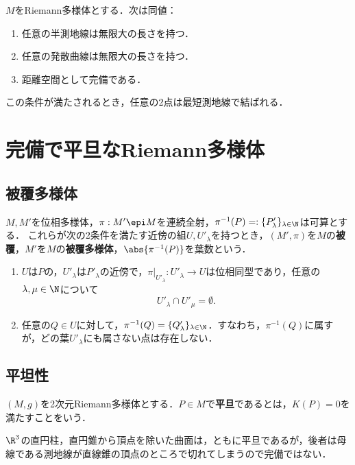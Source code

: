 \documentclass[uplatex,dvipdfmx]{jsreport}
\begin{document}
\begin{theorem}
    $M$をRiemann多様体とする．次は同値：
    \begin{enumerate}
        \item 任意の半測地線は無限大の長さを持つ．
        \item 任意の発散曲線は無限大の長さを持つ．
        \item 距離空間として完備である．
    \end{enumerate}
    この条件が満たされるとき，任意の2点は最短測地線で結ばれる．
\end{theorem}

\section{完備で平旦なRiemann多様体}

\subsection{被覆多様体}

\begin{definition}
    $M,M'$を位相多様体，$\pi:M'\epi M$を連続全射，$\pi^{-1}(P)=:\{P'_{\lambda}\}_{\lambda\in\N}$は可算とする．
    これらが次の2条件を満たす近傍の組$U,U'_\lambda$を持つとき，$(M',\pi)$を$M$の\textbf{被覆}，$M'$を$M$の\textbf{被覆多様体}，$\abs{\pi^{-1}(P)}$を葉数という．
    \begin{enumerate}
        \item $U$は$P$の，$U'_\lambda$は$P'_\lambda$の近傍で，$\pi|_{U'_\lambda}:U'_\lambda\to U$は位相同型であり，任意の$\lambda,\mu\in\N$について
        \[U'_\lambda\cap U'_\mu=\emptyset.\]
        \item 任意の$Q\in U$に対して，$\pi^{-1}(Q)=\{Q'_\lambda\}_{\lambda\in\N}$．すなわち，$\pi^{-1}(Q)$に属すが，どの葉$U'_\lambda$にも属さない点は存在しない．
    \end{enumerate}
\end{definition}

\subsection{平坦性}

\begin{definition}
    $(M,g)$を2次元Riemann多様体とする．$P\in M$で\textbf{平旦}であるとは，$K(P)=0$を満たすことをいう．
\end{definition}
\begin{example}
    $\R^3$の直円柱，直円錐から頂点を除いた曲面は，ともに平旦であるが，後者は母線である測地線が直線錐の頂点のところで切れてしまうので完備ではない．
\end{example}
\end{document}
